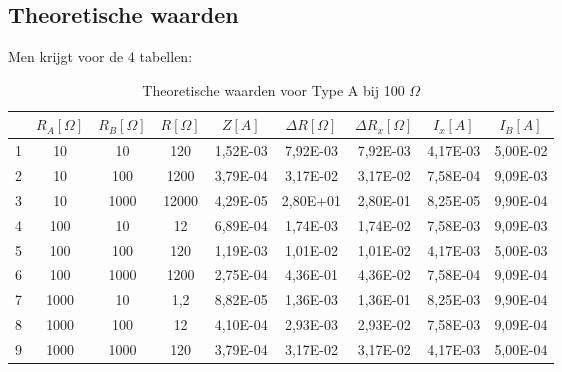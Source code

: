 \subsection{Theoretische waarden}
Men krijgt voor de 4 tabellen:
\begin{table}[H]
    \centering
    \label{tab:TA100}
    \caption{Theoretische waarden voor Type A bij 100 $\Omega$}
    \begin{tabular}{| c | c | c | c | c | c | c | c | c |}
        \hline
                & $R_A [\Omega]$    & $R_B [\Omega]$    & $R [\Omega]$  & $Z [A]$   & $\Delta R [\Omega]$   & $\Delta R_x [\Omega]$ & $I_x [A]$                 & $I_B [A]$             \\ \hline
        1       & 10                & 10                & 120           & 1,52E-03  & 7,92E-03              & 7,92E-03              & 4,17E-03                  & 5,00E-02 \\ \hline
        2       & 10                & 100               & 1200          & 3,79E-04  & 3,17E-02              & 3,17E-02              & 7,58E-04                  & 9,09E-03  \\ \hline   
        3       & 10                & 1000              & 12000         & 4,29E-05  & 2,80E+01              & 2,80E-01              & 8,25E-05                  & 9,90E-04  \\ \hline
        4       & 100               & 10                & 12            & 6,89E-04  & 1,74E-03              & 1,74E-02              & 7,58E-03                  & 9,09E-03  \\ \hline
        5	& 100	   &100	&120	&1,19E-03	&1,01E-02	&1,01E-02	&4,17E-03	&5,00E-03 \\ \hline
        6	&100	&1000	&1200	&2,75E-04	&4,36E-01	&4,36E-02	&7,58E-04	&9,09E-04 \\ \hline
        7	&1000	&10	&1,2	&8,82E-05	&1,36E-03	&1,36E-01	&8,25E-03	&9,90E-04 \\ \hline 
        8	&1000	&100	&12	&4,10E-04	&2,93E-03	&2,93E-02	&7,58E-03	&9,09E-04 \\ \hline
        9	&1000	&1000	&120	&3,79E-04	&3,17E-02	&3,17E-02	&4,17E-03	&5,00E-04 \\ \hline
    \end{tabular}
\end{table}
